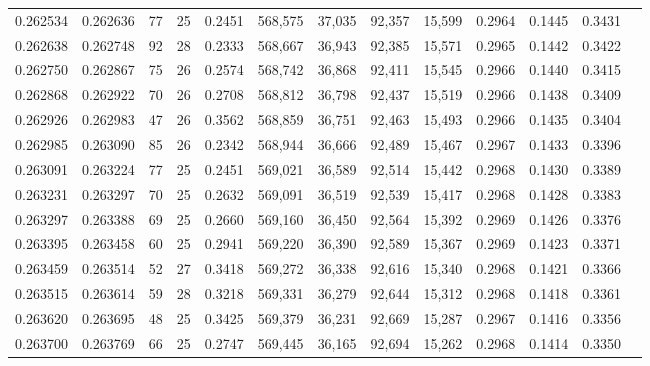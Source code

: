 \begin{tabular}{rrrrrrrrrrrrr}
0.262534 & 0.262636 &  77 &  25 &                                     0.2451 & 568,575 &  37,035 &  92,357 &  15,599 & 0.2964 & 0.1445 & 0.3431 \\
0.262638 & 0.262748 &  92 &  28 &                                     0.2333 & 568,667 &  36,943 &  92,385 &  15,571 & 0.2965 & 0.1442 & 0.3422 \\
0.262750 & 0.262867 &  75 &  26 &                                     0.2574 & 568,742 &  36,868 &  92,411 &  15,545 & 0.2966 & 0.1440 & 0.3415 \\
0.262868 & 0.262922 &  70 &  26 &                                     0.2708 & 568,812 &  36,798 &  92,437 &  15,519 & 0.2966 & 0.1438 & 0.3409 \\
0.262926 & 0.262983 &  47 &  26 &                                     0.3562 & 568,859 &  36,751 &  92,463 &  15,493 & 0.2966 & 0.1435 & 0.3404 \\
0.262985 & 0.263090 &  85 &  26 &                                     0.2342 & 568,944 &  36,666 &  92,489 &  15,467 & 0.2967 & 0.1433 & 0.3396 \\
0.263091 & 0.263224 &  77 &  25 &                                     0.2451 & 569,021 &  36,589 &  92,514 &  15,442 & 0.2968 & 0.1430 & 0.3389 \\
0.263231 & 0.263297 &  70 &  25 &                                     0.2632 & 569,091 &  36,519 &  92,539 &  15,417 & 0.2968 & 0.1428 & 0.3383 \\
0.263297 & 0.263388 &  69 &  25 &                                     0.2660 & 569,160 &  36,450 &  92,564 &  15,392 & 0.2969 & 0.1426 & 0.3376 \\
0.263395 & 0.263458 &  60 &  25 &                                     0.2941 & 569,220 &  36,390 &  92,589 &  15,367 & 0.2969 & 0.1423 & 0.3371 \\
0.263459 & 0.263514 &  52 &  27 &                                     0.3418 & 569,272 &  36,338 &  92,616 &  15,340 & 0.2968 & 0.1421 & 0.3366 \\
0.263515 & 0.263614 &  59 &  28 &                                     0.3218 & 569,331 &  36,279 &  92,644 &  15,312 & 0.2968 & 0.1418 & 0.3361 \\
0.263620 & 0.263695 &  48 &  25 &                                     0.3425 & 569,379 &  36,231 &  92,669 &  15,287 & 0.2967 & 0.1416 & 0.3356 \\
0.263700 & 0.263769 &  66 &  25 &                                     0.2747 & 569,445 &  36,165 &  92,694 &  15,262 & 0.2968 & 0.1414 & 0.3350 \\

\end{tabular}
